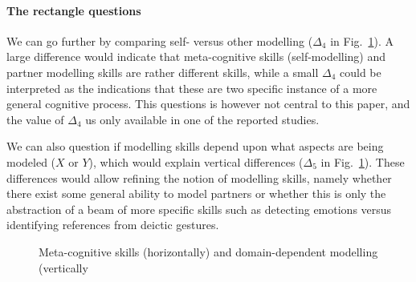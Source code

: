 \documentclass[natbib]{svjour3}
\newcommand{\Model}[3]{{$\mathcal{M}^{\circ}(#1, #2, #3)$}}
\begin{document}
\paragraph{The rectangle questions}

We can go further by comparing self- versus other modelling ($\Delta_4$ in
Fig.~\ref{mm_rectangle}). A large difference would indicate that meta-cognitive
skills (self-modelling) and partner modelling skills are rather different
skills, while a small $\Delta_4$ could be interpreted as the indications that
these are two specific instance of a more general cognitive process. This
questions is however not central to this paper, and the value of $\Delta_4$ us
only available in one of the reported studies.

We can also question if modelling skills depend upon what aspects are being
modeled ($X$ or $Y$), which would explain vertical differences ($\Delta_5$ in
Fig.~\ref{mm_rectangle}).  These differences would allow refining the notion of
modelling skills, namely whether there exist some general ability to model
partners or whether this is only the abstraction of a beam of more specific
skills such as detecting emotions versus identifying references from deictic
gestures.

\begin{figure}[htb]
\centering


\caption{\small Meta-cognitive skills (horizontally) and domain-dependent modelling (vertically}

\label{mm_rectangle}
\end{figure}



\end{document}

